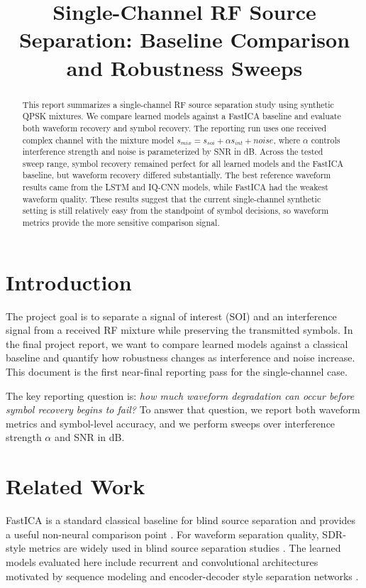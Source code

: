 \documentclass[conference]{IEEEtran}
\title{Single-Channel RF Source Separation: Baseline Comparison and Robustness Sweeps}
\author{\IEEEauthorblockN{DL-AIR Team Draft}
\IEEEauthorblockA{Single-channel reporting run prepared for course feedback}}
\begin{document}
\maketitle

\begin{abstract}
This report summarizes a single-channel RF source separation study using synthetic QPSK mixtures. We compare learned models against a FastICA baseline and evaluate both waveform recovery and symbol recovery. The reporting run uses one received complex channel with the mixture model $s_{mix}=s_{soi} + \alpha s_{int} + noise$, where $\alpha$ controls interference strength and noise is parameterized by SNR in dB. Across the tested sweep range, symbol recovery remained perfect for all learned models and the FastICA baseline, but waveform recovery differed substantially. The best reference waveform results came from the LSTM and IQ-CNN models, while FastICA had the weakest waveform quality. These results suggest that the current single-channel synthetic setting is still relatively easy from the standpoint of symbol decisions, so waveform metrics provide the more sensitive comparison signal.
\end{abstract}

\section{Introduction}
The project goal is to separate a signal of interest (SOI) and an interference signal from a received RF mixture while preserving the transmitted symbols. In the final project report, we want to compare learned models against a classical baseline and quantify how robustness changes as interference and noise increase. This document is the first near-final reporting pass for the single-channel case.

The key reporting question is: \emph{how much waveform degradation can occur before symbol recovery begins to fail?} To answer that question, we report both waveform metrics and symbol-level accuracy, and we perform sweeps over interference strength $\alpha$ and SNR in dB.

\section{Related Work}
FastICA is a standard classical baseline for blind source separation and provides a useful non-neural comparison point \cite{hyvarinen1999fastica}. For waveform separation quality, SDR-style metrics are widely used in blind source separation studies \cite{vincent2006bss}. The learned models evaluated here include recurrent and convolutional architectures motivated by sequence modeling \cite{hochreiter1997lstm} and encoder-decoder style separation networks \cite{ronneberger2015unet}.
\end{document}
